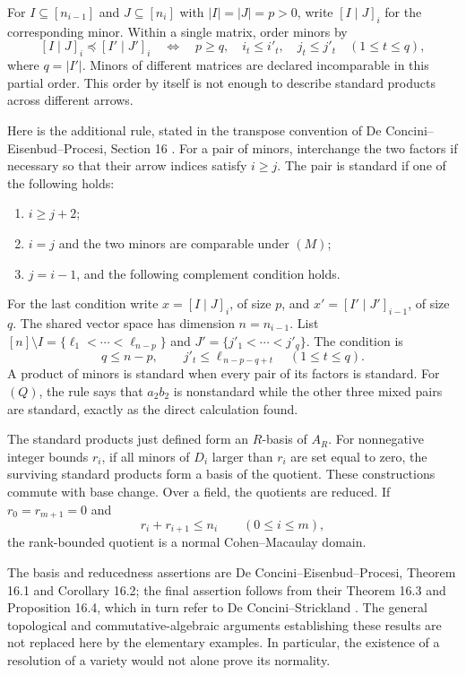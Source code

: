 For \(I\subseteq[n_{i-1}]\) and
\(J\subseteq[n_i]\) with \(|I|=|J|=p>0\),
write \([I\mid J]_i\) for the corresponding minor.
Within a single matrix, order minors by
\[
 [I\mid J]_i\preceq[I'\mid J']_i
 \quad\Longleftrightarrow\quad
 p\ge q,\quad i_t\le i'_t,\quad j_t\le j'_t
          \quad(1\le t\le q),
 \tag{M}
\]
where \(q=|I'|\).  Minors of different matrices
are declared incomparable in this partial order.
This order by itself is not enough to describe
standard products across different arrows.

Here is the additional rule, stated in the
transpose convention of De Concini--Eisenbud--Procesi,
Section 16 \cite{v2DEP1982}.  For a pair of minors,
interchange the two factors if necessary so that
their arrow indices satisfy \(i\ge j\).
The pair is standard if one of the following holds:

\begin{enumerate}
\item \(i\ge j+2\);
\item \(i=j\) and the two minors are comparable
      under \((M)\);
\item \(j=i-1\), and the following complement
      condition holds.
\end{enumerate}

For the last condition write
\(x=[I\mid J]_i\), of size \(p\), and
\(x'=[I'\mid J']_{i-1}\), of size \(q\).
The shared vector space has dimension
\(n=n_{i-1}\).  List
\([n]\setminus I=\{\ell_1<\cdots<\ell_{n-p}\}\)
and \(J'=\{j'_1<\cdots<j'_q\}\).  The condition is
\[
 q\le n-p,\qquad
 j'_t\le \ell_{\,n-p-q+t}\quad(1\le t\le q).
 \tag{MC}
\]
A product of minors is standard when every pair
of its factors is standard.  For \((Q)\), the
rule says that \(a_2b_2\) is nonstandard while
the other three mixed pairs are standard,
exactly as the direct calculation found.

\begin{theorem}
The standard products just defined form an \(R\)-basis
of \(A_R\).  For nonnegative integer bounds \(r_i\), if all minors of
\(D_i\) larger than \(r_i\) are set equal to zero, the surviving standard
products form a basis of the quotient.  These
constructions commute with base change.
Over a field, the quotients are reduced.
If \(r_0=r_{m+1}=0\) and
\[
 r_i+r_{i+1}\le n_i\qquad(0\le i\le m),
 \tag{A}
\]
the rank-bounded quotient is a normal
Cohen--Macaulay domain.
\end{theorem}

The basis and reducedness assertions are
De Concini--Eisenbud--Procesi, Theorem 16.1 and
Corollary 16.2; the final assertion follows from
their Theorem 16.3 and Proposition 16.4,
which in turn refer to De Concini--Strickland
\cite{v2DEP1982,v2DS1981}.
The general topological and commutative-algebraic
arguments establishing these results are not
replaced here by the elementary examples.
In particular, the existence of a resolution
of a variety would not alone prove its normality.

